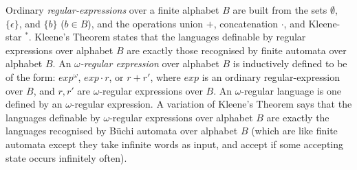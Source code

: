 \documentclass{llncs}
\newcommand{\head}[1]{\vspace{2mm} \noindent  {\bf #1}}
\newcommand{\sr}[1]{\footnote{{\color{red} Note. #1}}}
\renewcommand{\sr}[1]{}
\begin{document}
\head{Automata and Regular Expressions.}
%
Ordinary {\em regular-expressions} over a finite alphabet $B$ are built from the sets $\emptyset$, $\{\epsilon\}$, and $\{b\}$ ($b \in B$), and the operations union $+$, concatenation $\cdot$, and Kleene-star $\phantom{}^*$.
Kleene's Theorem states that the languages definable by regular expressions over alphabet $B$ are exactly those recognised by finite automata over alphabet $B$.
%
An {\em $\omega$-regular expression} over alphabet $B$ is inductively defined to be of the form: $exp^\omega$, $exp \cdot r$, or $r + r'$, where $exp$ is an ordinary regular-expression over $B$, and $r,r'$ are $\omega$-regular expressions over $B$. An {$\omega$-regular language} is one defined by an $\omega$-regular expression. A variation of Kleene's Theorem says that the languages definable by $\omega$-regular expressions over alphabet $B$ are exactly the languages recognised by B\"uchi automata over alphabet $B$ (which are like finite automata except they take infinite words as input, and accept if some accepting state occurs infinitely often).

\iffalse
We will use the McNaughton-Papert Theorem (and its generalisation to infinite-words) (see \cite{Thomas96,DiGa08}): it states that a regular language of ($\omega$)-words is star-free if and only if it is definable in first-order logic. For instance, the language $0^*1^*$ over alphabet $\{0,1\}$ is definable by the formula $\exists z. \forall x. [x \leq z \to P_0(x)] \wedge [x \not \leq z \to P_1(x)]$, and by the star-free regular expression $\neg( \neg{\emptyset} \cdot 1 \cdot 0 \cdot  \neg{\emptyset})$. Formally, a word $w \in B^*$ is coded as a structure with domain $[|w|]$, unary predicates $P_b := \{i \leq |w| : w_i = b\}$ (for $b \in B$), and the usual linear order $\leq$ on $[|w|]$; and thus the first-order definition may make use of these unary predicates and the linear order.
\fi

\end{document}
